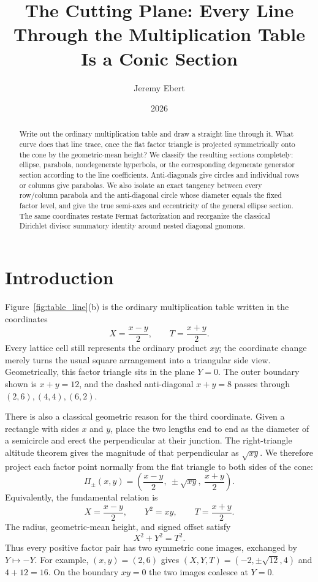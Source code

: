\documentclass[11pt]{amsart}
\title{The Cutting Plane: Every Line Through the Multiplication Table Is a Conic Section}
\author{Jeremy Ebert}
\date{2026}
\theoremstyle{remark}
\begin{document}
\maketitle

\begin{abstract}
Write out the ordinary multiplication table and draw a straight line through it. What curve does that line trace, once the flat factor triangle is projected symmetrically onto the cone by the geometric-mean height? We classify the resulting sections completely: ellipse, parabola, nondegenerate hyperbola, or the corresponding degenerate generator section according to the line coefficients. Anti-diagonals give circles and individual rows or columns give parabolas. We also isolate an exact tangency between every row/column parabola and the anti-diagonal circle whose diameter equals the fixed factor level, and give the true semi-axes and eccentricity of the general ellipse section. The same coordinates restate Fermat factorization and reorganize the classical Dirichlet divisor summatory identity around nested diagonal gnomons.
\end{abstract}

\section{Introduction}
Figure~\ref{fig:table_line}(b) is the ordinary multiplication table written in the coordinates
\[
X=\frac{x-y}{2},\qquad T=\frac{x+y}{2}.
\]
Every lattice cell still represents the ordinary product $xy$; the coordinate change merely turns the usual square arrangement into a triangular side view. Geometrically, this factor triangle sits in the plane $Y=0$. The outer boundary shown is $x+y=12$, and the dashed anti-diagonal $x+y=8$ passes through $(2,6),(4,4),(6,2)$.

There is also a classical geometric reason for the third coordinate. Given a rectangle with sides $x$ and $y$, place the two lengths end to end as the diameter of a semicircle and erect the perpendicular at their junction. The right-triangle altitude theorem gives the magnitude of that perpendicular as $\sqrt{xy}$. We therefore project each factor point normally from the flat triangle to both sides of the cone:
\[
\Pi_\pm(x,y)=\left(\frac{x-y}{2},\ \pm\sqrt{xy},\ \frac{x+y}{2}\right).
\]
Equivalently, the fundamental relation is
\[
X=\frac{x-y}{2},\qquad Y^2=xy,\qquad T=\frac{x+y}{2}.
\]
The radius, geometric-mean height, and signed offset satisfy
\[
X^2+Y^2=T^2.
\]
Thus every positive factor pair has two symmetric cone images, exchanged by $Y\mapsto-Y$. For example, $(x,y)=(2,6)$ gives $(X,Y,T)=(-2,\pm\sqrt{12},4)$ and $4+12=16$. On the boundary $xy=0$ the two images coalesce at $Y=0$.
\end{document}
